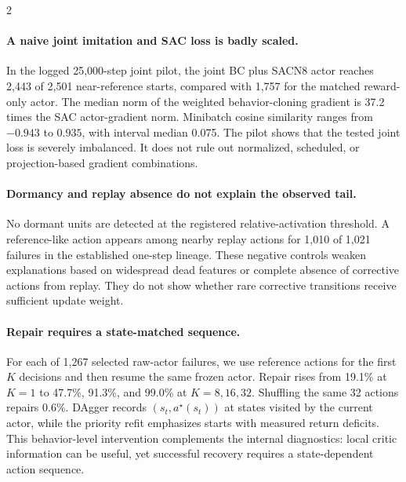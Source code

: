 \begin{multicols}{2}
\paragraph{A naive joint imitation and SAC loss is badly scaled.}
In the logged 25,000-step joint pilot, the joint BC plus SACN8 actor reaches 2,443 of 2,501 near-reference starts, compared with 1,757 for the matched reward-only actor. The median norm of the weighted behavior-cloning gradient is 37.2 times the SAC actor-gradient norm. Minibatch cosine similarity ranges from $-0.943$ to $0.935$, with interval median 0.075. The pilot shows that the tested joint loss is severely imbalanced. It does not rule out normalized, scheduled, or projection-based gradient combinations.

\paragraph{Dormancy and replay absence do not explain the observed tail.}
No dormant units are detected at the registered relative-activation threshold. A reference-like action appears among nearby replay actions for 1,010 of 1,021 failures in the established one-step lineage. These negative controls weaken explanations based on widespread dead features or complete absence of corrective actions from replay. They do not show whether rare corrective transitions receive sufficient update weight.

\paragraph{Repair requires a state-matched sequence.}
For each of 1,267 selected raw-actor failures, we use reference actions for the first $K$ decisions and then resume the same frozen actor. Repair rises from 19.1\% at $K=1$ to 47.7\%, 91.3\%, and 99.0\% at $K=8,16,32$. Shuffling the same 32 actions repairs 0.6\%. DAgger records $(s_t,a^\star(s_t))$ at states visited by the current actor, while the priority refit emphasizes starts with measured return deficits. This behavior-level intervention complements the internal diagnostics: local critic information can be useful, yet successful recovery requires a state-dependent action sequence.
\end{multicols}

\clearpage
\twocolumn
